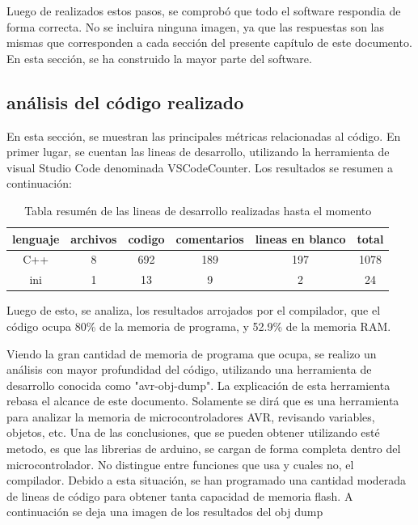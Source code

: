 Luego de realizados estos pasos, se comprobó que todo el software respondia de forma correcta. No se incluira ninguna imagen, ya que las respuestas son las mismas que corresponden a cada sección del presente capítulo de este documento. En esta sección, se ha construido la mayor parte del software. 


\subsection{análisis del código realizado}

En esta sección, se muestran las principales métricas relacionadas al código. 
En primer lugar, se cuentan las lineas de desarrollo, utilizando la herramienta de visual Studio Code denominada VSCodeCounter. Los resultados se resumen a continuación: 
\begin{table}
	\begin{tabular}{|c|c|c|c|c|c|}
		\hline 
		lenguaje& archivos & codigo & comentarios & lineas en blanco & total \\ 
		\hline 
		C++ & 8 &692 &189 &197 & 1078 \\
		\hline 
		ini &1 &13 &9 &2&24
	\end{tabular}
\caption{Tabla resumén de las lineas de desarrollo realizadas hasta el momento}
\end{table}

Luego de esto, se analiza, los resultados arrojados por el compilador, que el código ocupa 80\% de la memoria de programa, y 52.9\% de la memoria RAM. 

Viendo la gran cantidad de memoria de programa que ocupa, se realizo un análisis con mayor profundidad del código, utilizando una herramienta de desarrollo conocida como "avr-obj-dump". La explicación de esta herramienta rebasa el alcance de este documento. Solamente se dirá que es una herramienta para analizar la memoria de microcontroladores AVR, revisando variables, objetos, etc. Una de las conclusiones, que se pueden obtener utilizando esté metodo, es que las librerias de arduino, se cargan de forma completa dentro del microcontrolador. No distingue entre funciones que usa y cuales no, el compilador. Debido a esta situación, se han programado una cantidad moderada de lineas de código para obtener tanta capacidad de memoria flash. A continuación se deja una imagen de los resultados del obj dump 

